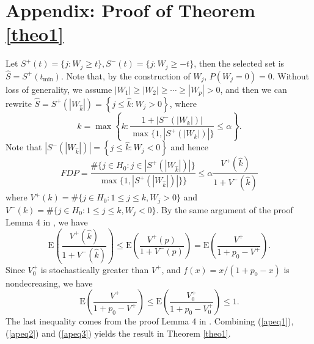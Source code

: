 \documentclass[a4paper,12pt]{article}
\newcommand{\E}{\mathrm{E}}
\begin{document}
\section{Appendix: Proof of Theorem \ref{theo1}}
Let $S^+(t) = \{j: W_j \ge t\}, S^-(t) = \{j: W_j \ge -t\}$, then the selected set is $\hat S = S^+(t_{\min})$. Note that, by the construction of $W_j$, $P(W_j=0)=0$. Without loss of generality, we assume $|W_1| \ge |W_2| \ge \cdots \ge |W_p| > 0$, and then we can rewrite $\hat S = S^+\left (|W_{\hat k}|\right ) = \left \{ j \le \hat k: W_j >0\right \}$, where
$$
\hat k = \max \left \{k: \frac{1 + \left|S^-\left(\left|W_k\right|\right)\right|}{\max \{1, \left|S^+\left(\left|W_k\right|\right)\right|\}} \le \alpha \right \}.
$$
Note that $ \left|S^-\left(\left|W_{\hat k}\right|\right)\right| = \left \{ j \le \hat k: W_j < 0\right \}$ and hence
\begin{equation}\label{apeq1}
FDP = \frac{\# \{j \in H_0: j \in \left|S^+\left(\left|W_{\hat k}\right|\right)\right|\}}{\max \{1, \left|S^+\left(\left|W_{\hat k}\right|\right)\right|\}\}}  \le \alpha \frac{V^+(\hat k)}{1 + V^-(\hat k)}
\end{equation}
where $V^+(k) = \# \{j \in H_0: 1 \le j \le k, W_j > 0\}$ and $V^-(k) = \# \{j \in H_0: 1 \le j \le k, W_j < 0\}$. By the same argument of the proof Lemma 4 in \cite{barber2015controlling}, we have
\begin{equation}\label{apeq2}
\E \left(\frac{V^+(\hat k)}{1 + V^-(\hat k)}\right) \le\E \left(\frac{V^+(p)}{1 + V^-(p)}\right) =  \E \left(\frac{V^+}{1 + p_0 - V^+}\right).
\end{equation}
Since $V_0^+$ is stochastically greater than $V^+$, and $f(x) = x/(1+p_0-x)$ is nondecreasing, we have
\begin{equation}\label{apeq3}
\E \left(\frac{V^+}{1 + p_0 - V^+}\right) \le \E \left(\frac{V^+_0}{1 + p_0 - V^+_0} \right) \le 1.
\end{equation}
The last inequality comes from the proof Lemma 4 in \cite{barber2015controlling}. Combining (\ref{apeq1}), (\ref{apeq2}) and (\ref{apeq3}) yields the result in Theorem \ref{theo1}.




\end{document}
